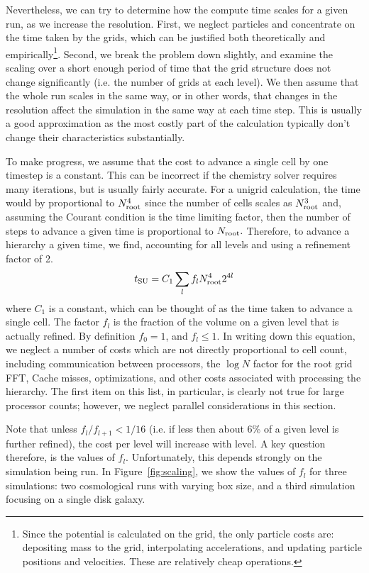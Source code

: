Nevertheless, we can try to determine how the compute time scales for a given run, as we increase the resolution.  First, we neglect particles and concentrate on the time taken by the grids, which can be justified both theoretically and empirically\footnote{Since the potential is calculated on the grid, the only particle costs are: depositing mass to the grid, interpolating accelerations, and updating particle positions and velocities.  These are relatively cheap operations.}.  Second, we break the problem down slightly, and examine the scaling over a short enough period of time that the grid structure does not change significantly (i.e. the number of grids at each level).  We then assume that the whole run scales in the same way, or in other words, that changes in the resolution affect the simulation in the same way at each time step.  This is usually a good approximation as the most costly part of the calculation typically don't change their characteristics substantially.

To make progress, we assume that the cost to advance a single cell by one timestep is a constant.  This can be incorrect if the chemistry solver requires many iterations, but is usually fairly accurate.  For a unigrid calculation, the time would by proportional to $N_{\rm root}^4$ since the number of cells scales as $N_{\rm root}^3$ and, assuming the Courant condition is the time limiting factor, then the number of steps to advance a given time is proportional to $N_{\rm root}.$  Therefore, to advance a hierarchy a given time, we find, accounting for all levels and using a refinement factor of 2.
\begin{equation}
t_{\rm SU} = C_1 \sum_l f_l N_{\rm root}^4 2^{4l}
\end{equation}
where $C_1$ is a constant, which can be thought of as the time taken to advance a single cell.  The factor $f_l$ is the fraction of the volume on a given level that is actually refined.  By definition $f_0 = 1$, and $f_l \le 1$.  In writing down this equation, we neglect a number of costs which are not directly proportional to cell count, including communication between processors, the $\log{N}$ factor for the root grid FFT, Cache misses, optimizations, and other costs associated with processing the hierarchy.  The first item on this list, in particular, is clearly not true for large processor counts; however, we neglect parallel considerations in this section.

Note that unless $f_l/f_{l+1} < 1/16$ (i.e. if less then about 6\% of a given level is further refined), the cost per level will increase with level.  A key question therefore, is the values of $f_l$.  Unfortunately, this depends strongly on the simulation being run.  In Figure~\ref{fig:scaling}, we show the values of $f_l$ for three simulations: two cosmological runs with varying box size, and a third simulation focusing on a single disk galaxy.

